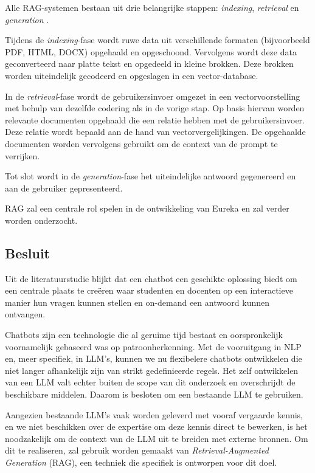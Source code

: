 Alle RAG-systemen bestaan uit drie belangrijke stappen: \textit{indexing}, \textit{retrieval} en \textit{generation} \autocite{Gao2023}.

Tijdens de \textit{indexing}-fase wordt ruwe data uit verschillende formaten (bijvoorbeeld PDF, HTML, DOCX) opgehaald en opgeschoond. Vervolgens wordt deze data geconverteerd naar platte tekst en opgedeeld in kleine brokken. Deze brokken worden uiteindelijk gecodeerd en opgeslagen in een vector-database.

In de \textit{retrieval}-fase wordt de gebruikersinvoer omgezet in een vectorvoorstelling met behulp van dezelfde codering als in de vorige stap. Op basis hiervan worden relevante documenten opgehaald die een relatie hebben met de gebruikersinvoer. Deze relatie wordt bepaald aan de hand van vectorvergelijkingen. De opgehaalde documenten worden vervolgens gebruikt om de context van de prompt te verrijken.

Tot slot wordt in de \textit{generation}-fase het uiteindelijke antwoord gegenereerd en aan de gebruiker gepresenteerd.

RAG zal een centrale rol spelen in de ontwikkeling van Eureka en zal verder worden onderzocht.

\subsection{Besluit}

Uit de literatuurstudie blijkt dat een chatbot een geschikte oplossing biedt om een centrale plaats te creëren waar studenten en docenten op een interactieve manier hun vragen kunnen stellen en on-demand een antwoord kunnen ontvangen.

Chatbots zijn een technologie die al geruime tijd bestaat en oorspronkelijk voornamelijk gebaseerd was op patroonherkenning. Met de vooruitgang in NLP en, meer specifiek, in LLM's, kunnen we nu flexibelere chatbots ontwikkelen die niet langer afhankelijk zijn van strikt gedefinieerde regels. Het zelf ontwikkelen van een LLM valt echter buiten de scope van dit onderzoek en overschrijdt de beschikbare middelen. Daarom is besloten om een bestaande LLM te gebruiken.

Aangezien bestaande LLM's vaak worden geleverd met vooraf vergaarde kennis, en we niet beschikken over de expertise om deze kennis direct te bewerken, is het noodzakelijk om de context van de LLM uit te breiden met externe bronnen. Om dit te realiseren, zal gebruik worden gemaakt van \textit{Retrieval-Augmented Generation} (RAG), een techniek die specifiek is ontworpen voor dit doel.

